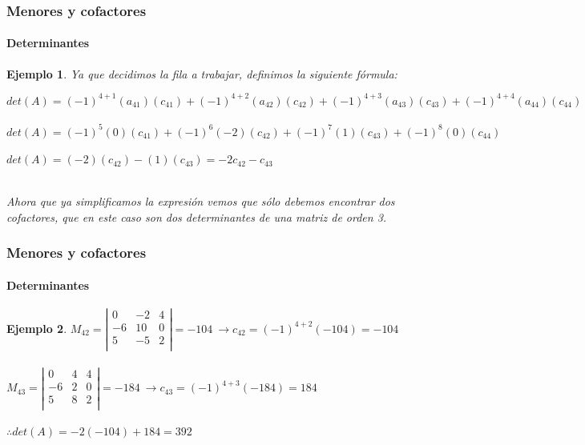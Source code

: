 \documentclass[11pt]{beamer}
\newtheorem{ejem}{Ejemplo}
\begin{document}
\begin{frame}
\frametitle{Menores y cofactores}
\framesubtitle{Determinantes}
\begin{ejem}
Ya que decidimos la fila a trabajar, definimos la siguiente fórmula:\\
\begin{center}
$det(A)=(-1)^{4+1}(a_{41})(c_{41})+(-1)^{4+2}(a_{42})(c_{42})+(-1)^{4+3}(a_{43})(c_{43})+(-1)^{4+4}(a_{44})(c_{44})$\\ \hspace{0cm} \\
$det(A)=(-1)^{5}(0)(c_{41})+(-1)^{6}(-2)(c_{42})+(-1)^{7}(1)(c_{43})+(-1)^{8}(0)(c_{44})$\\ \hspace{0cm} \\
$det(A)=(-2)(c_{42})-(1)(c_{43}) = -2c_{42}-c_{43}$ \\ \hspace{0cm} \\ 
\end{center}
Ahora que ya simplificamos la expresión vemos que sólo debemos encontrar dos cofactores, que en este caso son dos determinantes de una matriz de orden 3.
\end{ejem}
\end{frame}

\begin{frame}
\frametitle{Menores y cofactores}
\framesubtitle{Determinantes}
\begin{ejem}
$M_{42} = \left|
\begin{array}{ccc}
0 & -2 & 4\\
-6 & 10 & 0\\
5 & -5 & 2\\
\end{array}
\right| = -104 ~ \rightarrow c_{42}=(-1)^{4+2}(-104) = -104$ \\ \hspace{0cm} \\

$M_{43} = \left|
\begin{array}{ccc}
0 & 4 & 4\\
-6 & 2 & 0\\
5 & 8 & 2\\
\end{array}
\right| = -184 ~ \rightarrow c_{43}=(-1)^{4+3}(-184) = 184$ \\ \hspace{0cm} \\
$\therefore det(A) = -2(-104)+184 = 392$
\end{ejem}
\end{frame}
\end{document}
